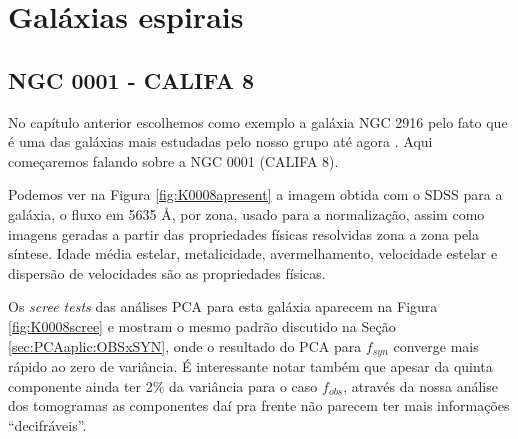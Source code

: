 \section{Galáxias espirais}
\label{sec:result:spirals}

\subsection{NGC 0001 - CALIFA 8}

No capítulo anterior escolhemos como exemplo a galáxia NGC 2916 pelo fato que é uma das galáxias mais estudadas pelo
nosso grupo até agora \citep{CidFernandes2013, CidFernandes2014}. Aqui começaremos falando sobre a NGC 0001 (CALIFA 8).

Podemos ver na Figura \ref{fig:K0008apresent} a imagem obtida com o SDSS para a galáxia, o fluxo em 5635 \AA, por zona,
usado para a normalização, assim como imagens geradas a partir das propriedades físicas resolvidas zona a zona pela
síntese. Idade média estelar, metalicidade, avermelhamento, velocidade estelar e dispersão de velocidades são
as propriedades físicas. 

Os {\em scree tests} das análises PCA para esta galáxia aparecem na Figura \ref{fig:K0008scree} e mostram o mesmo padrão
discutido na Seção \ref{sec:PCAaplic:OBSxSYN}, onde o resultado do PCA para $f_{syn}$ converge mais rápido ao zero de
variância. É interessante notar também que apesar da quinta componente ainda ter 2\% da variância para o caso $f_{obs}$,
através da nossa análise dos tomogramas as componentes daí pra frente não parecem ter mais informações ``decifráveis''.

